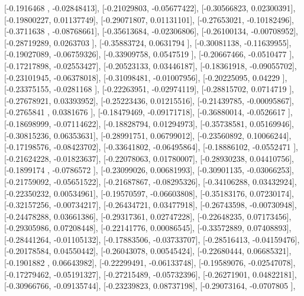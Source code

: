 \documentclass{article}
\begin{document}
       [-0.1916468 , -0.02848413],
       [-0.21029803, -0.05677422],
       [-0.30566823,  0.02300391],
       [-0.19800227,  0.01137749],
       [-0.29071807,  0.01131101],
       [-0.27653021, -0.10182496],
       [-0.3711638 , -0.08768661],
       [-0.35613684, -0.02306806],
       [-0.26100134, -0.00708952],
       [-0.28719289,  0.0263703 ],
       [-0.35883724,  0.0631794 ],
       [-0.30081138, -0.11639955],
       [-0.19027089, -0.06759326],
       [-0.33909758,  0.0547519 ],
       [-0.20667466, -0.0510477 ],
       [-0.17217898, -0.02553427],
       [-0.20523133,  0.03446187],
       [-0.18361918, -0.09055702],
       [-0.23101945, -0.06378018],
       [-0.31098481, -0.01007956],
       [-0.20225095,  0.04229   ],
       [-0.23375155, -0.0281168 ],
       [-0.22263951, -0.02974119],
       [-0.28815702,  0.0714719 ],
       [-0.27678921,  0.03393952],
       [-0.25223436,  0.01215516],
       [-0.21439785, -0.00095867],
       [-0.2765841 ,  0.0381676 ],
       [-0.18479469, -0.09171718],
       [-0.36880014, -0.0526617 ],
       [-0.18698999, -0.07114622],
       [-0.18828794,  0.01294973],
       [-0.35738581,  0.05169946],
       [-0.30815236,  0.06353631],
       [-0.28991751,  0.06799012],
       [-0.23560892,  0.10066244],
       [-0.17198576, -0.08423702],
       [-0.33641802, -0.06495864],
       [-0.18886102, -0.0552471 ],
       [-0.21624228, -0.01823637],
       [-0.22078063,  0.01780007],
       [-0.28930238,  0.04410756],
       [-0.1899174 , -0.0786572 ],
       [-0.23099026,  0.00681993],
       [-0.30901135, -0.03066253],
       [-0.21759092, -0.05651522],
       [-0.21687867, -0.08295326],
       [-0.34106288,  0.03432924],
       [-0.22350232,  0.00534961],
       [-0.19570597, -0.06603808],
       [-0.35183176,  0.07230174],
       [-0.32157256, -0.00734217],
       [-0.26434721,  0.03477918],
       [-0.26743598, -0.00730948],
       [-0.24478288,  0.03661386],
       [-0.29317361,  0.02747228],
       [-0.22648235,  0.07173456],
       [-0.29305986,  0.07208448],
       [-0.22141776,  0.00086545],
       [-0.33572889,  0.07408893],
       [-0.28441264, -0.01105132],
       [-0.17883506, -0.03733707],
       [-0.28516413, -0.04159476],
       [-0.20178584,  0.04550442],
       [-0.26043078,  0.00545424],
       [-0.22680444,  0.06685321],
       [-0.1901882 ,  0.06643982],
       [-0.22299491, -0.06133748],
       [-0.19589076, -0.02547078],
       [-0.17279462, -0.05191327],
       [-0.27215489, -0.05732396],
       [-0.26271901,  0.04822181],
       [-0.30966766, -0.09135744],
       [-0.23239823,  0.08737198],
       [-0.29073164, -0.0707805 ],
\end{document}
